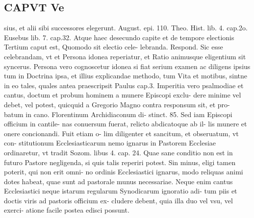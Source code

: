 \documentclass{article}
\begin{document}
\begin{pages}
\section*{CAPVT  Ve }
\marginpar{[ p.357 ]}\pstart sius, et alii sibi successores elegerunt. August. epi. 110. Theo. Hist. lib. 4. cap.2o. Eusebus lib. 7. cap.32. Atque haec desecundo capite et de tempore electionis Tertium caput est, Quomodo sit electio cele- lebranda. Respond. Sic esse celebrandam, vt et Persona idonea reperiatur, et Ratio animusque eligentium sit syncerus. Persona vero cognoscetur idonea si fiat serium examen ac diligens ipsius tum in Doctrina ipsa, et illius explicandae methodo, tum Vita et motibus, sintne in eo tales, quales antea praescripsit Paulus cap.3. Imperitia vero psalmodiae et cantus, doctum et probum hominem a munere Episcopi exclu- dere minime vel debet, vel potest, quicquid a Gregorio Magno contra responsum sit, et pro- batum in cano. Florentinum Archidiaconum di- stinct. 85. Sed iam Episcopi officium in cantile- nas conuersum fuerat, relicto abdicatoque ab il- lis munere et onere concionandi. Fuit etiam o- lim diligenter et sancitum, et obseruatum, vt con- stitutionum Ecclesiasticarum nemo ignarus in Pastorem Ecclesiae ordinaretur, vt tradit Sozom. libus 4. cap. 24. Quae sane conditio non est in futuro Pastore negligenda, si quis talis reperiri potest. Sin minus, eligi tamen poterit, qui non erit omni- no ordinis Ecclesiastici ignarus, modo reliquas animi dotes habeat, quae sunt ad pastorale munus necessariae. Neque enim cantus Ecclesiastici neque istarum regularum Synodicarum ignoratio adi- tum piis et doctis viris ad pastoris officium ex- cludere debent, quia illa duo vel vsu, vel exerci- atione facile postea edisci possunt.  \pend

\end{pages}
\end{document}
